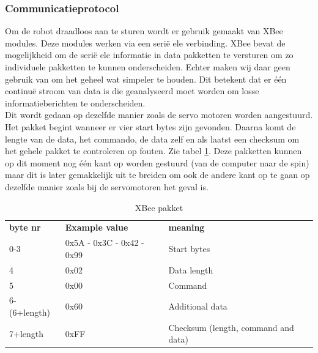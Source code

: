 \documentclass[10pt,a4paper]{article}
\begin{document}
\subsubsection{Communicatieprotocol}
Om de robot draadloos aan te sturen wordt er gebruik gemaakt van XBee modules. Deze modules werken via een seri\"e ele verbinding. XBee bevat de mogelijkheid om de seri\"e ele informatie in data pakketten te versturen om zo individuele pakketten te kunnen onderscheiden. Echter maken wij daar geen gebruik van om het geheel wat simpeler te houden. Dit betekent dat er \' e\'en continu\"e stroom van data is die geanalyseerd moet worden om losse informatieberichten te onderscheiden.\\
Dit wordt gedaan op dezelfde manier zoals de servo motoren worden aangestuurd. Het pakket begint wanneer er vier start bytes zijn gevonden. Daarna komt de lengte van de data, het commando, de data zelf en als laatst een checksum om het gehele pakket te controleren op fouten. Zie tabel \ref{transmit-xbee}. Deze pakketten kunnen op dit moment nog \'e\'en kant op worden gestuurd (van de computer naar de spin) maar dit is later gemakkelijk uit te breiden om ook de andere kant op te gaan op dezelfde manier zoals bij de servomotoren het geval is.
\begin{table}[h]
\centering
\begin{tabular}{lll}
\textbf{byte nr}      & \textbf{Example value}             & \textbf{meaning}                           \\
0-3          & 0x5A - 0x3C - 0x42 - 0x99 & Start bytes                       \\
4            & 0x02                      & Data length \\
5            & 0x00                      & Command                           \\
6-(6+length) & 0x60                      & Additional data                   \\
7+length     & 0xFF                      & Checksum (length, command and data)                  
\end{tabular}
\caption{XBee pakket}
\label{transmit-xbee}
\end{table}
\end{document}
